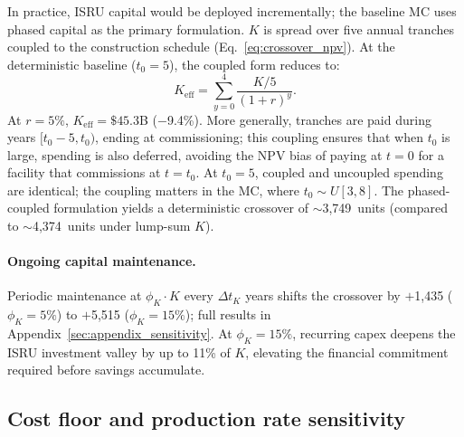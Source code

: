 In practice, ISRU capital would be deployed incrementally; the baseline MC uses phased capital as the primary formulation. $K$ is spread over five annual tranches coupled to the construction schedule (Eq.~\ref{eq:crossover_npv}). At the deterministic baseline ($t_0 = 5$), the coupled form reduces to:
\begin{equation}
  K_{\mathrm{eff}} = \sum_{y=0}^{4} \frac{K/5}{(1+r)^y}.
  \label{eq:phased_capital}
\end{equation}
At $r = 5\%$, $K_{\mathrm{eff}} = \$45.3$B ($-$9.4\%). More generally, tranches are paid during years $[t_0 - 5, t_0)$, ending at commissioning; this coupling ensures that when $t_0$ is large, spending is also deferred, avoiding the NPV bias of paying at $t = 0$ for a facility that commissions at $t = t_0$. At $t_0 = 5$, coupled and uncoupled spending are identical; the coupling matters in the MC, where $t_0 \sim U[3,8]$. The phased-coupled formulation yields a deterministic crossover of $\sim$3{,}749~units (compared to $\sim$4{,}374~units under lump-sum $K$).

\paragraph{Ongoing capital maintenance.} Periodic maintenance at $\phi_K \cdot K$ every $\Delta t_K$ years shifts the crossover by $+$1{,}435 ($\phi_K = 5\%$) to $+$5{,}515 ($\phi_K = 15\%$); full results in Appendix~\ref{sec:appendix_sensitivity}. At $\phi_K = 15\%$, recurring capex deepens the ISRU investment valley by up to 11\% of $K$, elevating the financial commitment required before savings accumulate.

\subsection{Cost floor and production rate sensitivity}
\label{sec:cfloor_prodrate}

